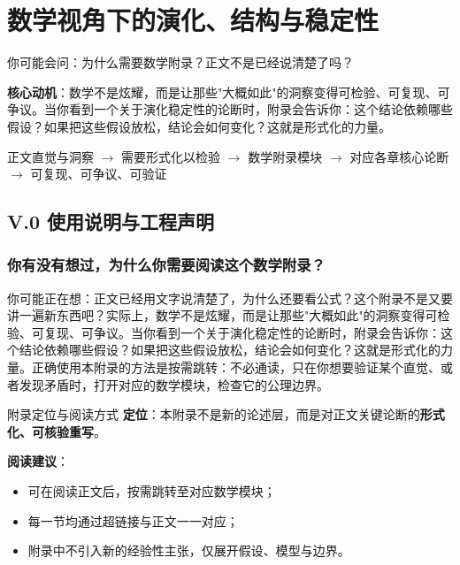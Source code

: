 \documentclass[../main.tex]{subfiles}
\begin{document}
	
	\chapter{数学视角下的演化、结构与稳定性}
	
	\begin{motivation}
		你可能会问：为什么需要数学附录？正文不是已经说清楚了吗？
		
		\textbf{核心动机}：数学不是炫耀，而是让那些"大概如此"的洞察变得可检验、可复现、可争议。当你看到一个关于演化稳定性的论断时，附录会告诉你：这个结论依赖哪些假设？如果把这些假设放松，结论会如何变化？这就是形式化的力量。
	\end{motivation}
	
\begin{logicmap}
	正文直觉与洞察
	$\rightarrow$ 需要形式化以检验
	$\rightarrow$ 数学附录模块
	$\rightarrow$ 对应各章核心论断
	$\rightarrow$ 可复现、可争议、可验证
\end{logicmap}

	\section{V.0 使用说明与工程声明}
	
	\subsection{你有没有想过，为什么你需要阅读这个数学附录？}
	你可能正在想：正文已经用文字说清楚了，为什么还要看公式？这个附录不是又要讲一遍新东西吧？实际上，数学不是炫耀，而是让那些"大概如此"的洞察变得可检验、可复现、可争议。当你看到一个关于演化稳定性的论断时，附录会告诉你：这个结论依赖哪些假设？如果把这些假设放松，结论会如何变化？这就是形式化的力量。正确使用本附录的方法是按需跳转：不必通读，只在你想要验证某个直觉、或者发现矛盾时，打开对应的数学模块，检查它的公理边界。
	
	\begin{mathbox}{附录定位与阅读方式}
		\textbf{定位}：本附录不是新的论述层，而是对正文关键论断的\textbf{形式化、可核验重写}。
		
		\textbf{阅读建议}：
		\begin{itemize}
			\item 可在阅读正文后，按需跳转至对应数学模块；
			\item 每一节均通过超链接与正文一一对应；
			\item 附录中不引入新的经验性主张，仅展开假设、模型与边界。
		\end{itemize}
	\end{mathbox}
	
\end{document}

